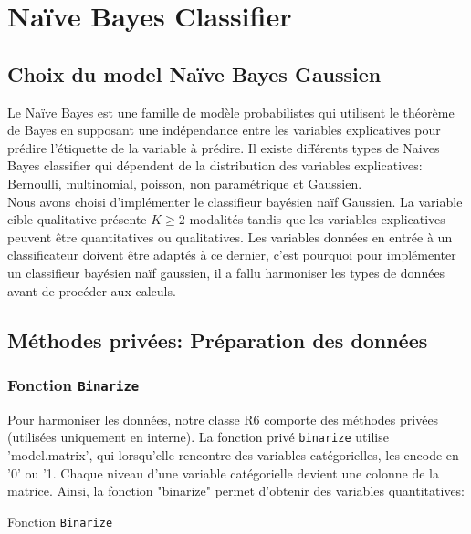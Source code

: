 \documentclass[]{article}
\begin{document}
\section{Naïve Bayes Classifier}
 \itshape
\subsection{Choix du model Naïve Bayes Gaussien}

Le Naïve Bayes est une famille de modèle probabilistes qui utilisent le théorème de Bayes en supposant une indépendance entre les variables explicatives pour prédire l'étiquette de la variable à prédire. 
Il existe différents types de Naives Bayes classifier qui dépendent de la distribution des variables explicatives: Bernoulli, multinomial, poisson, non paramétrique  et Gaussien. \vspace{0.2\baselineskip}\\
Nous avons choisi d'implémenter le classifieur bayésien naïf Gaussien. La variable cible qualitative présente \( K \geq 2 \) modalités tandis que les variables explicatives peuvent être quantitatives ou qualitatives. Les variables données en entrée à un classificateur doivent être adaptés à ce dernier, c'est pourquoi pour implémenter un classifieur bayésien naïf gaussien, il a fallu harmoniser les types de données avant de procéder aux calculs. 
\vspace{0.2\baselineskip}

\subsection{Méthodes privées: Préparation des données}
\subsubsection{Fonction \texttt{Binarize}} 

Pour harmoniser les données, notre classe R6 comporte des méthodes privées (utilisées uniquement en interne). La fonction privé \texttt{binarize} utilise 'model.matrix', qui lorsqu'elle rencontre des variables catégorielles, les encode en '0' ou '1. Chaque niveau d'une variable catégorielle devient une colonne de la matrice. Ainsi, la fonction "binarize" permet d'obtenir des variables quantitatives: 
\vspace{0.3\baselineskip}

\begin{algorithm}
        \caption{Fonction \texttt{Binarize}}


\end{algorithm}
\end{document}
